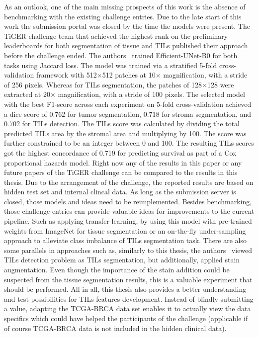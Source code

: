 As an outlook, one of the main missing prospects of this work is the absence of
benchmarking with the existing challenge entries. Due to the late start of this
work the submission portal was closed by the time the models were present. 
The TiGER challenge team that achieved the highest rank on the preliminary leaderboards
for both segmentation of tissue and TILs published their approach before the challenge ended.
The authors~\cite{shephard2022tiager} trained Efficient-UNet-B0 for both tasks using Jaccard loss.
The model was trained via a stratified 5-fold
cross-validation framework with 512$\times$512 patches at 10$\times$ magnification,
with a stride of 256 pixels. Whereas for TILs segmentation,
the patches of 128$\times$128 were extracted at 20$\times$ magnification, with a stride of 100 pixels.
The selected model with the best F1-score across each experiment on 5-fold cross-validation achieved
a dice score of 0.762 for tumor segmentation, 0.718 for stroma segmentation, and  0.702 for TILs
detection. The TILs score was calculated by dividing the total predicted TILs area by the stromal
area and multiplying by 100. The score was further constrained to be an integer between 0 and 100.
The resulting TILs scores got the highest concordance of 0.719 for predicting survival as part of
a Cox proportional hazards model. Right now any of the results in this paper or any future papers
of the TiGER challenge can be compared to the results in this thesis. Due to the arrangement of the
challenge, the reported results are based on hidden test set and internal clincal data.
As long as the submission server is closed, those models and ideas need to be reimplemented.
Besides benchmarking, those challenge entries can provide valuable ideas for improvements to the current pipeline.
Such as applying transfer-learning, by using this model with pre-trained weights from ImageNet for tissue
segmentation or an on-the-fly under-sampling approach to alleviate class imbalance of TILs segmentation task.
There are also some parallels in approaches such as, similarly to this thesis, the authors~\cite{shephard2022tiager}
viewed TILs detection problem as TILs segmentation, but additionally, applied stain augmentation. Even though the
importance of the stain addition could be
suspected from the tissue segmentation results, this is a valuable experiment that should be performed.
All in all, this thesis also provides a better understanding and test possibilities for TILs features development.
Instead of blindly submitting a value, adapting the TCGA-BRCA data set enables it to actually view the data specifics
which could have helped the participants of the challenge (applicable if of course TCGA-BRCA data is not included in
the hidden clinical data).